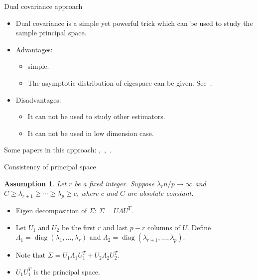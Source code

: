 \documentclass{beamer}
\DeclareMathOperator{\mydiag}{diag}
\theoremstyle{plain}
\newtheorem{assumption}{\quad\quad Assumption}
\theoremstyle{definition}
\theoremstyle{remark}
\begin{document}
\begin{frame}{Dual covariance approach}
    \begin{itemize}
        \item
Dual covariance is a simple yet powerful trick which can be used to study the sample principal space.
        \item
            Advantages:
            \begin{itemize}
            \item
                simple.
            \item
            The asymptotic distribution of eigespace can be given. See~\cite{Fan2015Asymptotics}.
            \end{itemize}
        \item
            Disadvantages:
            \begin{itemize}
                \item
                    It can not be used to study other estimators.
                \item
                    It can not be used in low dimension case.
            \end{itemize}
    \end{itemize}
    Some papers in this approach:
\cite{Jung2009PCA},~\cite{Shen2013Consistency},~\cite{Fan2015Asymptotics}.
\end{frame}
\begin{frame}{Consistency of principal space}

    \begin{assumption}
        Let $r$ be a fixed integer. Suppose $\lambda_r n/p\to \infty$ and $C\geq \lambda_{r+1}\geq \cdots \geq \lambda_p\geq c$, where $c$ and $C$ are absolute constant.
    \end{assumption}
    \begin{itemize}
        \item
   Eigen decomposition of $\Sigma$: $\Sigma=U\Lambda U^T$.
            \item
                Let $U_1$ and $U_2$ be the first $r$ and last $p-r$ columns of $U$. Define $\Lambda_1=\mydiag(\lambda_1,\ldots,\lambda_r)$ and $\Lambda_2=\mydiag(\lambda_{r+1},\ldots,\lambda_p)$.
            \item
    
    Note that $\Sigma= U_1\Lambda_1 U_1^T +U_2\Lambda_2 U_2^T$.
\item
    $U_1 U_1^T$ is the principal space.
    \end{itemize}


\end{frame}
\end{document}
